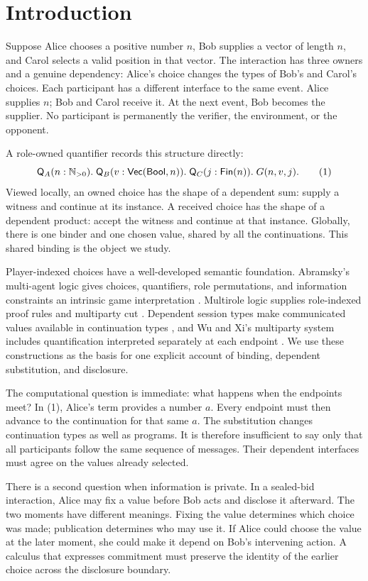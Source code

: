 \section{Introduction}

Suppose Alice chooses a positive number $n$, Bob supplies a vector of length
$n$, and Carol selects a valid position in that vector. The interaction has
three owners and a genuine dependency: Alice's choice changes the types of
Bob's and Carol's choices. Each participant has a different interface to the
same event. Alice supplies $n$; Bob and Carol receive it. At the next event,
Bob becomes the supplier. No participant is permanently the verifier, the
environment, or the opponent.

A role-owned quantifier records this structure directly:
\[
 \mathsf Q_A(n:\mathbb N_{>0}).\;
 \mathsf Q_B(v:\mathsf{Vec}(\mathsf{Bool},n)).\;
 \mathsf Q_C(j:\mathsf{Fin}(n)).\;G(n,v,j).
 \tag{1}
\]
Viewed locally, an owned choice has the shape of a dependent sum: supply a
witness and continue at its instance. A received choice has the shape of a
dependent product: accept the witness and continue at that instance. Globally,
there is one binder and one chosen value, shared by all the continuations.
This shared binding is the object we study.

Player-indexed choices have a well-developed semantic foundation.
Abramsky's multi-agent logic gives choices, quantifiers, role permutations,
and information constraints an intrinsic game interpretation
\cite{Abramsky2007}. Multirole logic supplies role-indexed proof rules and
multiparty cut \cite{XiWu2023}. Dependent session types make communicated
values available in continuation types \cite{ToninhoCairesPfenning2011}, and
Wu and Xi's multiparty system includes quantification interpreted separately
at each endpoint \cite{WuXi2018}. We use these constructions as the basis for
one explicit account of binding, dependent substitution, and disclosure.

The computational question is immediate: what happens when the endpoints
meet? In (1), Alice's term provides a number $a$. Every endpoint must then
advance to the continuation for that same $a$. The substitution changes
continuation types as well as programs. It is therefore insufficient to say
only that all participants follow the same sequence of messages. Their
dependent interfaces must agree on the values already selected.

There is a second question when information is private. In a sealed-bid
interaction, Alice may fix a value before Bob acts and disclose it afterward.
The two moments have different meanings. Fixing the value determines which
choice was made; publication determines who may use it. If Alice could choose
the value at the later moment, she could make it depend on Bob's intervening
action. A calculus that expresses commitment must preserve the identity of the
earlier choice across the disclosure boundary.

